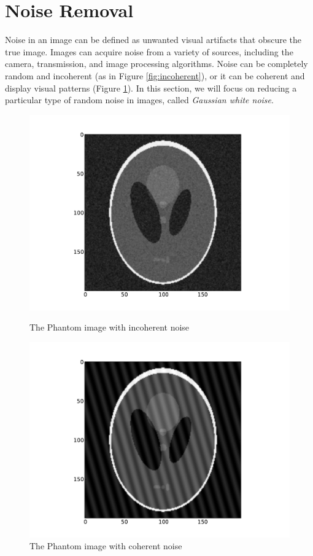 \section*{Noise Removal}
Noise in an image can be defined as unwanted visual artifacts that
obscure the true image. Images can acquire noise from a variety of
sources, including the camera, transmission, and image processing
algorithms. Noise can be completely random and incoherent (as in
Figure \ref{fig:incoherent}), or it can be coherent and display
visual patterns (Figure \ref{fig:coherent}). In this section, we will
focus on reducing a particular type of random noise in images, called
\textit{Gaussian white noise}.

\begin{figure}[t]
    \includegraphics[width=\linewidth]{phantom_random.pdf}
    \caption{The Phantom image with incoherent noise}
    \label{fig:incoherent}
\endminipage\hfill
{}
    \includegraphics[width=\linewidth]{phantom_coherent.pdf}
    \caption{The Phantom image with coherent noise}
    \label{fig:coherent}
\endminipage
\end{figure}

